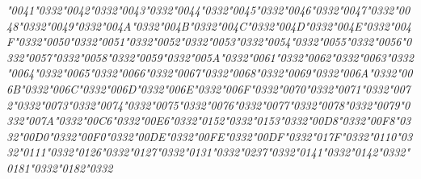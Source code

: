 \documentclass[landscape]{article}
\newcommand{\gs}{\hspace{0.5mm}}	%
\begin{document}
{\itshape
	\char"0041\char"0332\gs \char"0042\char"0332\gs \char"0043\char"0332\gs \char"0044\char"0332\gs \char"0045\char"0332\gs \char"0046\char"0332\gs \char"0047\char"0332\gs \char"0048\char"0332\gs \char"0049\char"0332\gs \char"004A\char"0332\gs \char"004B\char"0332\gs \char"004C\char"0332\gs \char"004D\char"0332\gs \char"004E\char"0332\gs \char"004F\char"0332\gs \char"0050\char"0332\gs \char"0051\char"0332\gs \char"0052\char"0332\gs \char"0053\char"0332\gs \char"0054\char"0332\gs \char"0055\char"0332\gs \char"0056\char"0332\gs \char"0057\char"0332\gs \char"0058\char"0332\gs \char"0059\char"0332\gs \char"005A\char"0332\gs \char"0061\char"0332\gs \char"0062\char"0332\gs \char"0063\char"0332\gs \char"0064\char"0332\gs \char"0065\char"0332\gs \char"0066\char"0332\gs \char"0067\char"0332\gs \char"0068\char"0332\gs \char"0069\char"0332\gs \char"006A\char"0332\gs \char"006B\char"0332\gs \char"006C\char"0332\gs \char"006D\char"0332\gs \char"006E\char"0332\gs \char"006F\char"0332\gs \char"0070\char"0332\gs \char"0071\char"0332\gs \char"0072\char"0332\gs \char"0073\char"0332\gs \char"0074\char"0332\gs \char"0075\char"0332\gs \char"0076\char"0332\gs \char"0077\char"0332\gs \char"0078\char"0332\gs \char"0079\char"0332\gs \char"007A\char"0332\gs \char"00C6\char"0332\gs \char"00E6\char"0332\gs \char"0152\char"0332\gs \char"0153\char"0332\gs \char"00D8\char"0332\gs \char"00F8\char"0332\gs \char"00D0\char"0332\gs \char"00F0\char"0332\gs \char"00DE\char"0332\gs \char"00FE\char"0332\gs \char"00DF\char"0332\gs \char"017F\char"0332\gs \char"0110\char"0332\gs \char"0111\char"0332\gs \char"0126\char"0332\gs \char"0127\char"0332\gs \char"0131\char"0332\gs \char"0237\char"0332\gs \char"0141\char"0332\gs \char"0142\char"0332\gs \char"0181\char"0332\gs \char"0182\char"0332
}
\end{document}
